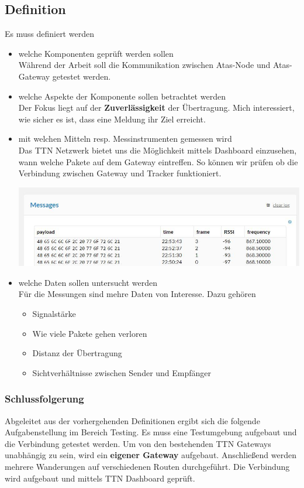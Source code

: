 \documentclass[11pt,english,german]{report}
\theoremstyle{definition}
\begin{document}
\subsection{Definition}
Es muss definiert werden
\begin{itemize}
	\item welche Komponenten geprüft werden sollen\\[0.3cm]
	Während der Arbeit soll die Kommunikation zwischen Atas-Node und Atas-Gateway getestet werden.
	\item welche Aspekte der Komponente sollen betrachtet werden\\[0.3cm]
	Der Fokus liegt auf der \textbf{Zuverlässigkeit} der Übertragung. Mich interessiert, wie sicher es ist, dass eine Meldung ihr Ziel erreicht. 
	\item mit welchen Mitteln resp. Messinstrumenten gemessen wird\\[0.3cm]
	Das TTN Netzwerk bietet uns die Möglichkeit mittels Dashboard einzusehen, wann welche Pakete auf dem Gateway eintreffen. So können wir prüfen ob die Verbindung zwischen Gateway und Tracker funktioniert.\bigskip
	
	\begin{minipage}{\linewidth}
		\centering
		\includegraphics[width=\linewidth]{img/ttn_messages}
	\end{minipage}
	
	\item welche Daten sollen untersucht werden\\[0.3cm]
	Für die Messungen sind mehre Daten von Interesse. Dazu gehören 
	\begin{itemize}
		\item Signalstärke
		\item Wie viele Pakete gehen verloren
		\item Distanz der Übertragung
		\item Sichtverhältnisse zwischen Sender und Empfänger
	\end{itemize}
\end{itemize}

\subsubsection{Schlussfolgerung}
Abgeleitet aus der vorhergehenden Definitionen ergibt sich die folgende Aufgabenstellung im Bereich Testing. Es muss eine Testumgebung aufgebaut und die Verbindung getestet werden. Um von den bestehenden TTN Gateways unabhängig zu sein, wird ein \textbf{eigener Gateway} aufgebaut. Anschließend werden mehrere Wanderungen auf verschiedenen Routen durchgeführt. Die Verbindung wird aufgebaut und mittels TTN Dashboard geprüft.
\end{document}
